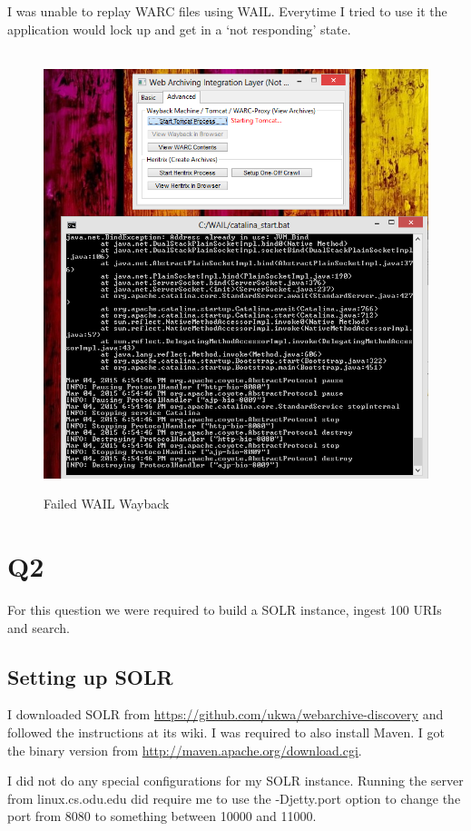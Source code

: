 \documentclass[12pt]{article}
\begin{document}
I was unable to replay WARC files using WAIL.  Everytime I tried to use it the application would lock up and get in a `not responding' state.

\begin{figure}[H]
    \caption{Failed WAIL Wayback}
    \centering
    \includegraphics{failwayback.PNG}
\end{figure}



\section{Q2}

For this question we were required to build a SOLR instance, ingest 100 URIs and search.

\subsection{Setting up SOLR}

I downloaded SOLR from \url{https://github.com/ukwa/webarchive-discovery} and followed the instructions at its wiki.  I was required to also install Maven.  I got the binary version from \url{http://maven.apache.org/download.cgi}.

I did not do any special configurations for my SOLR instance. Running the server from linux.cs.odu.edu did require me to use the -Djetty.port option to change the port from 8080 to something between 10000 and 11000.
\end{document}
